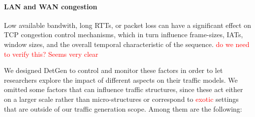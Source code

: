 \documentclass{article}
\begin{document}
\paragraph{LAN and WAN congestion}
Low available bandwith, long RTTs, or packet loss can have a significant effect on TCP congestion control mechanisms, which in turn influence frame-sizes, IATs, window sizes, and the overall temporal characteristic of the sequence. \textcolor{red}{do we need to verify this? Seems very clear}

\vspace{0.3cm}
We designed DetGen to control and monitor these factors in order to let researchers explore the impact of different aspects on their traffic models. We omitted some factors that can influence traffic structures, since these act either on a larger scale rather than micro-structures or correspond to \textcolor{red}{exotic} settings that are outside of our traffic generation scope. Among them are the following:
\end{document}
